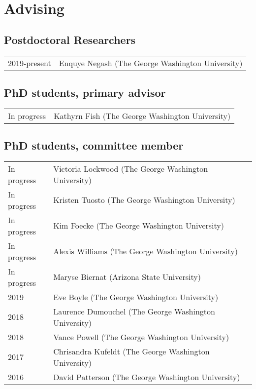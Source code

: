 \documentclass{article}
\begin{document}
\section*{Advising}
\subsection*{Postdoctoral Researchers}
\begin{tabular}{p{}p{}}
2019-present & Enquye Negash (The George Washington University)\\[4pt]
\end{tabular}

\subsection*{PhD students, primary advisor}
\begin{tabular}{p{}p{}}
In progress & Kathyrn Fish (The George Washington University)\\[4pt]
\end{tabular}

\subsection*{PhD students, committee member}
\begin{tabular}{p{}p{}}
In progress & Victoria Lockwood (The George Washington University)\\[4pt]
In progress & Kristen Tuosto (The George Washington University)\\[4pt]
In progress & Kim Foecke (The George Washington University)\\[4pt]
In progress & Alexis Williams (The George Washington University)\\[4pt]
In progress & Maryse Biernat (Arizona State University)\\[4pt]
2019 & Eve Boyle (The George Washington University)\\[4pt]
2018 & Laurence Dumouchel (The George Washington University)\\[4pt]
2018 & Vance Powell (The George Washington University)\\[4pt]
2017 & Chrisandra Kufeldt (The George Washington University)\\[4pt]
2016 & David Patterson (The George Washington University)\\

\end{tabular}
\end{document}
